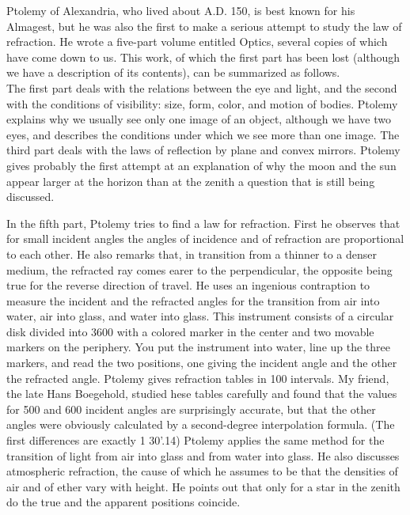             Ptolemy of Alexandria, who lived about A.D. 150, is best known for his Almagest, but he was also the first to make a serious attempt to study the law of refraction. He wrote a five-part volume entitled Optics, several copies of which have come down to us. This work, of which the first part has been lost (although we have a description of its contents), can be summarized as follows.\\

            The first part deals with the relations between the eye and light, and the second with the conditions of visibility: size, form, color, and motion of bodies. Ptolemy explains why we usually see only one image of an object, although we have two eyes, and describes the conditions under which we see more than one image. The third part deals with the laws of reflection by plane and convex mirrors. Ptolemy gives probably the first attempt at an explanation of why the moon and the sun appear larger at the horizon than at the zenith a question that is still being discussed.

            In the fifth part, Ptolemy tries to find a law for refraction. First he observes that for small incident angles the angles of incidence and of refraction are proportional to each other. He also remarks that, in transition from a thinner to a denser medium, the refracted ray comes earer to the perpendicular, the opposite being true for the reverse direction of travel. He uses an ingenious contraption to measure the incident and the refracted angles for the transition from air into water, air into glass, and water into glass. This instrument consists of a circular disk divided into 3600 with a colored marker in the center and two movable markers on the periphery. You put the instrument into water, line up the three markers, and read the two positions, one giving the incident angle and the other the refracted angle. Ptolemy gives refraction tables in 100 intervals. My friend, the late Hans Boegehold, studied hese tables carefully and found that the values for 500 and 600 incident angles are surprisingly accurate, but that the other angles were obviously calculated by a second-degree interpolation formula. (The first differences are exactly 1 30'.14) Ptolemy applies the same method for the transition of light from air into glass and from water into glass. He also discusses atmospheric refraction, the cause of which he assumes to be that the densities of air and of ether vary with height. He points out that only for a star in the zenith do the true and the apparent positions coincide.

